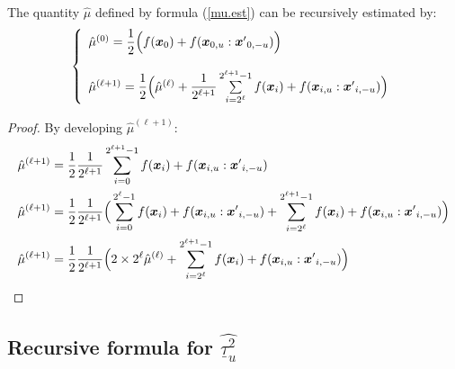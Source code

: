 \documentclass[]{elsarticle}
\theoremstyle{definition}
\newcommand{\bvec}[1]{\boldsymbol{#1}}
\newcommand{\vx}{\bvec{x}}
\begin{document}
The quantity $\hat{\mu}$ defined by formula (\ref{mu.est}) can be recursively estimated by:
\[\left \lbrace\begin{array}{l}
\hat{\mu}^{(0)} = \dfrac{1}{2} \Big{(} f(\vx_0)+f(\vx_{0,u}:{\vx'}_{0,-u}) \Big{)} \\
\\
\hat{\mu}^{(\ell+1)} = \dfrac{1}{2} \Big{(} \hat{\mu}^{(\ell)} + \dfrac{1}{2^{\ell+1}} \sum \limits_{i=2^{\ell}}^{2^{\ell+1}-1} f(\vx_i) + f(\vx_{i,u}:{\vx'}_{i,-u}) \Big{)}
\end{array}\right.\]
\begin{proof}
By developing $\hat{\mu}^{(\ell+1)}$:
\begin{align*}
\hat{\mu}^{(\ell+1)} &= \dfrac{1}{2} \dfrac{1}{2^{\ell+1}} \sum \limits_{i=0}^{2^{\ell+1}-1} f(\vx_i) + f(\vx_{i,u}:{\vx'}_{i,-u}) \\
\hat{\mu}^{(\ell+1)} &= \dfrac{1}{2} \dfrac{1}{2^{\ell+1}} \Big{(} \sum \limits_{i=0}^{2^{\ell}-1} f(\vx_i) + f(\vx_{i,u}:{\vx'}_{i,-u}) + \sum \limits_{i=2^{\ell}}^{2^{\ell+1}-1} f(\vx_i) + f(\vx_{i,u}:{\vx'}_{i,-u}) \Big{)}\\
\hat{\mu}^{(\ell+1)} &= \dfrac{1}{2} \dfrac{1}{2^{\ell+1}} \Big{(} 2 \times 2^{\ell}\hat{\mu}^{(\ell)} + \sum \limits_{i=2^{\ell}}^{2^{\ell+1}-1} f(\vx_i) + f(\vx_{i,u}:{\vx'}_{i,-u}) \Big{)}\\
\end{align*}
\end{proof}


\subsection{Recursive formula for $\widehat{\underline{\tau}_u^2}$}
\end{document}
